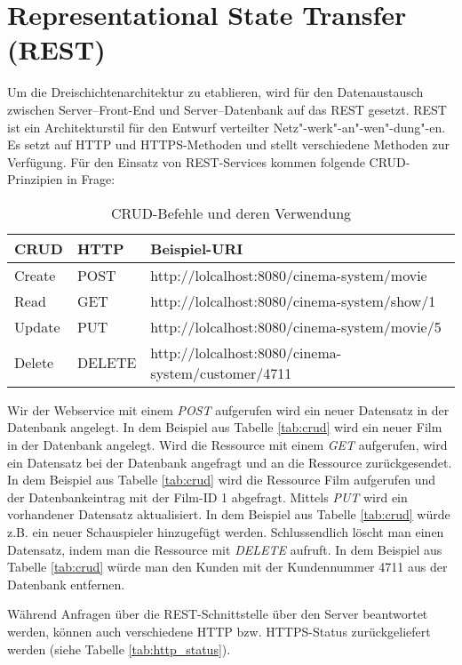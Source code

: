 \section{Representational State Transfer (REST)}
\label{sec:rest}
Um die Dreischichtenarchitektur zu etablieren, wird für den Datenaustausch zwischen Server--Front-End und Server--Datenbank auf das \acf{REST} gesetzt.
\acs{REST} ist ein Architekturstil für den Entwurf verteilter Netz"-werk"-an"-wen"-dung"-en.
Es setzt auf \acs{HTTP} und \acs{HTTPS}-Methoden und stellt verschiedene Methoden zur Verfügung.
Für den Einsatz von \acs{REST}-Services kommen folgende \acs{CRUD}-Prinzipien in Frage:

\begin{table}[ht]
	\begin{tabular}{l|l|l}
		\acs{CRUD} & \acs{HTTP} & Beispiel-\acs{URI} \\
		\hline
		Create & POST & http://lolcalhost:8080/cinema-system/movie \\
		Read & GET & http://lolcalhost:8080/cinema-system/show/1 \\
		Update & PUT & http://lolcalhost:8080/cinema-system/movie/5 \\
		Delete & DELETE & http://lolcalhost:8080/cinema-system/customer/4711 \\
	\end{tabular}
	\caption{\acs{CRUD}-Befehle und deren Verwendung}
	\label{tab:crud}
\end{table}

Wir der Webservice mit einem \textit{POST} aufgerufen wird ein neuer Datensatz in der Datenbank angelegt.
In dem Beispiel aus Tabelle \vref{tab:crud} wird ein neuer Film in der Datenbank angelegt.
Wird die Ressource mit einem \textit{GET} aufgerufen, wird ein Datensatz bei der Datenbank angefragt und an die Ressource zurückgesendet.
In dem Beispiel aus Tabelle \vref{tab:crud} wird die Ressource Film aufgerufen und der Datenbankeintrag mit der Film-ID 1 abgefragt.
Mittels \textit{PUT} wird ein vorhandener Datensatz aktualisiert.
In dem Beispiel aus Tabelle \vref{tab:crud} würde z.B. ein neuer Schauspieler hinzugefügt werden.
Schlussendlich löscht man einen Datensatz, indem man die Ressource mit \textit{DELETE} aufruft.
In dem Beispiel aus Tabelle \vref{tab:crud} würde man den Kunden mit der Kundennummer 4711 aus der Datenbank entfernen.


Während Anfragen über die \acs{REST}-Schnittstelle über den Server beantwortet werden, können auch verschiedene \acs{HTTP} bzw. \acs{HTTPS}-Status zurückgeliefert werden (siehe Tabelle \vref{tab:http_status}).

